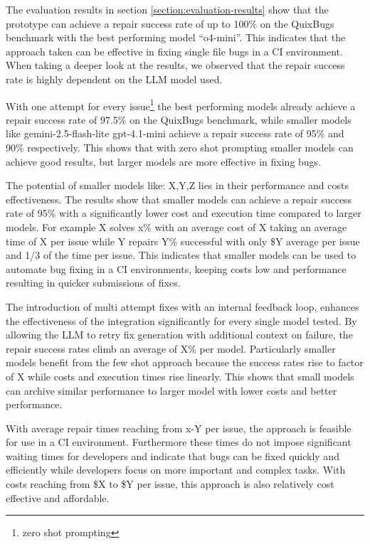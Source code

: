The evaluation results in section \ref{section:evaluation-results} show that the prototype can achieve a repair success rate of up to 100\% on the QuixBugs benchmark with the best performing model ``o4-mini''. This indicates that the approach taken can be effective in fixing single file bugs in a CI environment. When taking a deeper look at the results, we observed that the repair success rate is highly dependent on the LLM model used.

With one attempt for every issue\footnote{zero shot prompting} the best performing models already achieve a repair success rate of 97.5\% on the QuixBugs benchmark, while smaller models like gemini-2.5-flash-lite gpt-4.1-mini achieve a repair success rate of 95\% and 90\% respectively. This shows that with zero shot prompting smaller models can achieve good results, but larger models are more effective in fixing bugs.

The potential of smaller models like: X,Y,Z lies in their performance and costs effectiveness. The results show that smaller models can achieve a repair success rate of 95\% with a significantly lower cost and execution time compared to larger models. For example X solves x\% with an average cost of X taking an average time of X per issue while Y repairs Y\% successful with only \$Y average per issue and 1/3 of the time per issue. This indicates that smaller models can be used to automate bug fixing in a CI environments, keeping costs low and performance resulting in quicker submissions of fixes.

The introduction of multi attempt fixes with an internal feedback loop, enhances the effectiveness of the integration significantly for every single model tested. By allowing the LLM to retry fix generation with additional context on failure, the repair success rates climb an average of X\% per model. Particularly smaller models benefit from the few shot approach because the success rates rise to factor of X while costs and execution times rise linearly. This shows that small models can archive similar performance to larger model with lower costs and better performance.

With average repair times reaching from x-Y per issue, the approach is feasible for use in a CI environment. Furthermore these times do not impose significant waiting times for developers and indicate that bugs can be fixed quickly and efficiently while developers focus on more important and complex tasks. With costs reaching from \$X to \$Y per issue, this approach is also relatively cost effective and affordable.

